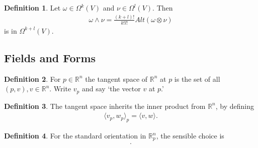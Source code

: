 \documentclass[20pt]{article}
\theoremstyle{plain}
\theoremstyle{definition}
\newtheorem{definition}{Definition}
\newcommand{\reals}{\mathbb{R}}
\begin{document}
\begin{definition}
  Let $\omega \in \Omega^k(V)$ and $\nu \in \Omega^l(V)$.
  Then
  \begin{align*}
    \omega \wedge \nu = \frac{(k+l)!}{k!l!}Alt(\omega \otimes \nu)
  \end{align*}
  is in $\Omega^{k+l}(V).$
\end{definition}


















































\break
\subsection{Fields and Forms}
\begin{definition}
  For $p \in \reals^n$ the tangent space of $\reals^n$ at $p$ is the set of all $(p, v), v \in \reals^n$.
  Write $v_p$ and say `the vector $v$ at $p$.'
\end{definition}

\begin{definition}
  The tangent space inherits the inner product from $\reals^n$, by defining
  \begin{align*}
    \langle v_p, w_p \rangle_p  = \langle v, w \rangle.
  \end{align*}
\end{definition}

\begin{definition}
  For the standard orientation in $\reals^n_p$, the sensible choice is
  \begin{align*}
    [(e_1)_p, ..., (e_n)_p].
  \end{align*}
\end{definition}
\end{document}
